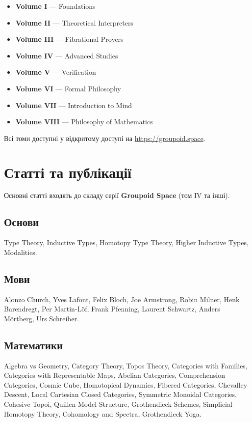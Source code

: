 \documentclass{article}
\begin{document}
\begin{itemize}[leftmargin=*]
    \item \textbf{Volume I} — Foundations
    \item \textbf{Volume II} — Theoretical Interpreters
    \item \textbf{Volume III} — Fibrational Provers
    \item \textbf{Volume IV} — Advanced Studies
    \item \textbf{Volume V} — Verification
    \item \textbf{Volume VI} — Formal Philosophy
    \item \textbf{Volume VII} — Introduction to Mind
    \item \textbf{Volume VIII} — Philosophy of Mathematics
\end{itemize}

Всі томи доступні у відкритому доступі на \href{https://groupoid.space}{https://groupoid.space}.

\section{Статті та публікації}
Основні статті входять до складу серії \textbf{Groupoid Space} (том IV та інші).

\subsection{Основи}
Type Theory, Inductive Types, Homotopy Type Theory, Higher Inductive Types, Modalities.

\subsection{Мови}
Alonzo Church, Yves Lafont, Felix Bloch, Joe Armstrong, Robin Milner, Henk Barendregt, Per Martin-Löf, Frank Pfenning, Laurent Schwartz, Anders Mörtberg, Urs Schreiber.

\subsection{Математики}
Algebra vs Geometry, Category Theory, Topos Theory, Categories with Families, Categories with Representable Maps, Abelian Categories, Comprehension Categories, Cosmic Cube, Homotopical Dynamics, Fibered Categories, Chevalley Descent, Local Cartesian Closed Categories, Symmetric Monoidal Categories, Cohesive Topoi, Quillen Model Structure, Grothendieck Schemes, Simplicial Homotopy Theory, Cohomology and Spectra, Grothendieck Yoga.
\end{document}
